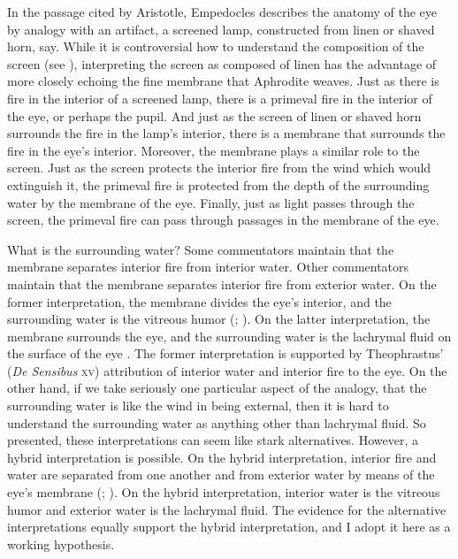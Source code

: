 In the passage cited by Aristotle, Empedocles describes the anatomy of the eye by analogy with an artifact, a screened lamp, constructed from linen or shaved horn, say. While it is controversial how to understand the composition of the screen (see \citealt[240--241]{Wright:1981zr}), interpreting the screen as composed of linen has the advantage of more closely echoing the fine membrane that Aphrodite weaves. Just as there is fire in the interior of a screened lamp, there is a primeval fire in the interior of the eye, or perhaps the pupil. And just as the screen of linen or shaved horn surrounds the fire in the lamp's interior, there is a membrane that surrounds the fire in the eye's interior. Moreover, the membrane plays a similar role to the screen. Just as the screen protects the interior fire from the wind which would extinguish it, the primeval fire is protected from the depth of the surrounding water by the membrane of the eye. Finally, just as light passes through the screen, the primeval fire can pass through passages in the membrane of the eye. 

What is the surrounding water? Some commentators maintain that the membrane separates interior fire from interior water. Other commentators maintain that the membrane separates interior fire from exterior water. On the former interpretation, the membrane divides the eye's interior, and the surrounding water is the vitreous humor (\citealt[16]{Beare:1906uq}; \citealt[241--242]{Wright:1981zr}). On the latter interpretation, the membrane surrounds the eye, and the surrounding water is the lachrymal fluid on the surface of the eye \citep{Sedley:1992uq}. The former interpretation is supported by Theophrastus' (\emph{De Sensibus} \textsc{xv}) attribution of interior water and interior fire to the eye. On the other hand, if we take seriously one particular aspect of the analogy, that the surrounding water is like the wind in being external, then it is hard to understand the surrounding water as anything other than lachrymal fluid. So presented, these interpretations can seem like stark alternatives. However, a hybrid interpretation is possible. On the hybrid interpretation, interior fire and water are separated from one another and from exterior water by means of the eye's membrane (\citealt[326]{Lloyd:1966ly}; \citealt[26 n39]{Ierodiakonou:2005fk}). On the hybrid interpretation, interior water is the vitreous humor and exterior water is the lachrymal fluid. The evidence for the alternative interpretations equally support the hybrid interpretation, and I adopt it here as a working hypothesis.

